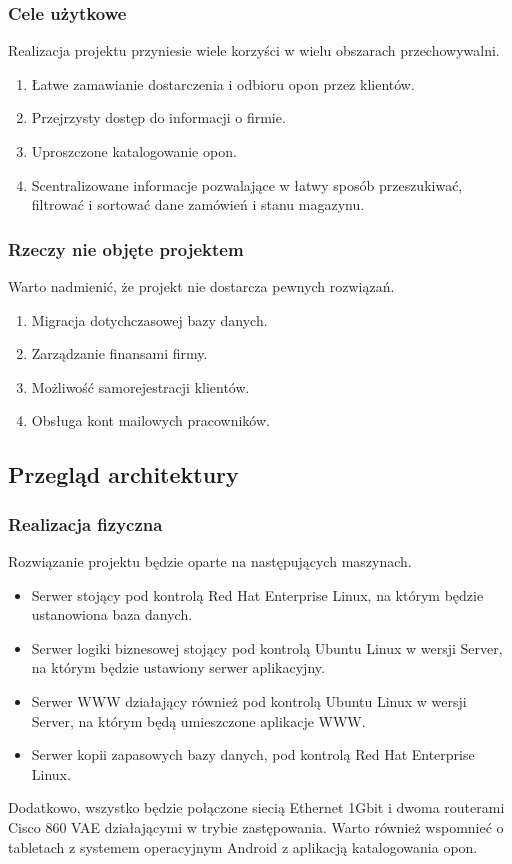     \subsubsection{Cele użytkowe}
      Realizacja projektu przyniesie wiele korzyści w wielu obszarach przechowywalni.
      \begin{enumerate}
        \item Łatwe zamawianie dostarczenia i odbioru opon przez klientów.
        \item Przejrzysty dostęp do informacji o firmie.
        \item Uproszczone katalogowanie opon.
        \item Scentralizowane informacje pozwalające w łatwy sposób przeszukiwać, filtrować i sortować dane zamówień i stanu magazynu.
      \end{enumerate}
    \subsubsection{Rzeczy nie objęte projektem}
      Warto nadmienić, że projekt nie dostarcza pewnych rozwiązań.
      \begin{enumerate}
        \item Migracja dotychczasowej bazy danych.
        \item Zarządzanie finansami firmy.
        \item Możliwość samorejestracji klientów.
        \item Obsługa kont mailowych pracowników.
      \end{enumerate}
  \subsection{Przegląd architektury}
    \subsubsection{Realizacja fizyczna}
      Rozwiązanie projektu będzie oparte na następujących maszynach.
      \begin{itemize}
        \item Serwer stojący pod kontrolą Red Hat Enterprise Linux, na którym będzie ustanowiona baza danych.
        \item Serwer logiki biznesowej stojący pod kontrolą Ubuntu Linux w wersji Server, na którym będzie ustawiony serwer aplikacyjny.
        \item Serwer WWW działający również pod kontrolą Ubuntu Linux w wersji Server, na którym będą umieszczone aplikacje WWW.
        \item Serwer kopii zapasowych bazy danych, pod kontrolą Red Hat Enterprise Linux.
      \end{itemize}
      Dodatkowo, wszystko będzie połączone siecią Ethernet 1Gbit i dwoma routerami Cisco 860 VAE działającymi w trybie zastępowania.
      Warto również wspomnieć o tabletach z systemem operacyjnym Android z aplikacją katalogowania opon.
